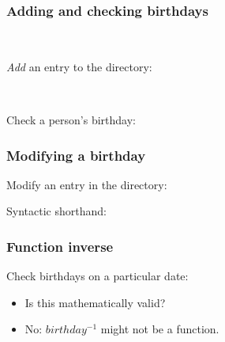 \documentclass{beamer}
\begin{document}
\begin{frame}

\frametitle{Adding and checking birthdays}

~

\textit{Add} an entry to the directory: 
\pause
{}

~

\alert{Check} a person's birthday:
\pause
{}


\end{frame}



\begin{frame}

\frametitle{Modifying a birthday}

\alert{Modify} an entry in the directory: 
\pause
{}

\alert{Syntactic shorthand:} 


\end{frame}





\begin{frame}


\frametitle{Function inverse}

Check birthdays on a particular date:


\begin{itemize}
\item Is this mathematically valid? \pause
\item No:  $ birthday^{-1}$ might not be a function.
\end{itemize}




\end{frame}
\end{document}
